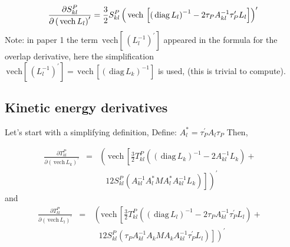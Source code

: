 \documentclass[12pt,thmsa]{article}
\begin{document}
\begin{equation}
\frac{\partial S_{kl}^P}{\partial \left( \,\mathrm{vech}\,L_l\right)
^{\prime }}=\frac 32S_{kl}^P\left( \,\mathrm{vech}\,\left[ \left( \,\mathrm{%
diag}\,L_l\right) ^{-1}-2\tau _PA_{kl}^{-1}\tau _P^{\prime }L_l\right]
\right) ^{\prime }
\end{equation}
Note: in paper 1 the term $\,\mathrm{vech}\left[ \,\left( L_l^{-1}\right)
^{\prime }\right] $ appeared in the formula for the overlap derivative, here
the simplification $\,\mathrm{vech}\left[ \,\left( L_l^{-1}\right) ^{\prime
}\right] =\,\mathrm{vech}\,\left[ \left( \,\mathrm{diag}\,L_k\right)
^{-1}\right] $ is used, (this is trivial to compute).

\subsection{Kinetic energy derivatives}

Let's start with a simplifying definition, Define: $A_l^{*}=\tau _P^{\prime
}A_l\tau _P$ Then,

\begin{eqnarray}
\frac{\partial T_{kl}^P}{\partial \left( \,\mathrm{vech}\,L_k\right)
^{\prime }} &=&\left( \,\mathrm{vech}\,\left[ \frac 32T_{kl}^P\left( \left(
\,\mathrm{diag}\,L_k\right) ^{-1}-2A_{kl}^{-1}L_k\right) + 
\begin{array}{c}
\end{array}
\right. \right.  \nonumber \\
&&\left. \left. 
\begin{array}{c}
\end{array}
12S_{kl}^P\left( A_{kl}^{-1}A_l^{*}MA_l^{*}A_{kl}^{-1}L_k\right) \right]
\right) ^{\prime }
\end{eqnarray}
and 
\begin{eqnarray}
\frac{\partial T_{kl}^P}{\partial \left( \,\mathrm{vech}\,L_l\right)
^{\prime }} &=&\,\left( \mathrm{vech}\,\left[ \frac 32T_{kl}^P\left( \left(
\,\mathrm{diag}\,L_l\right) ^{-1}-2\tau _PA_{kl}^{-1}\tau _P^{\prime
}L_l\right) + 
\begin{array}{c}
\end{array}
\right. \right.  \nonumber \\
&&\left. \left. 
\begin{array}{c}
\end{array}
12S_{kl}^P\left( \tau _PA_{kl}^{-1}A_kMA_kA_{kl}^{-1}\tau _P^{\prime
}L_l\right) \right] \right) ^{\prime }
\end{eqnarray}
\end{document}
